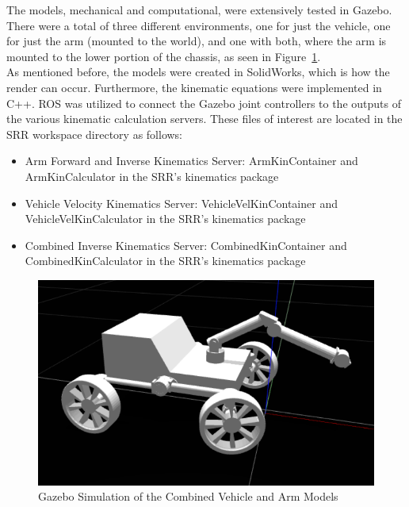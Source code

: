 The models, mechanical and computational, were extensively tested in Gazebo. There were a total of three different environments, one for just the vehicle, one for just the arm (mounted to the world), and one with both, where the arm is mounted to the lower portion of the chassis, as seen in Figure~\ref{sample_return_rover:model_validation:combined}. \\

As mentioned before, the models were created in SolidWorks, which is how the render can occur. Furthermore, the kinematic equations were implemented in C++. ROS was utilized to connect the Gazebo joint controllers to the outputs of the various kinematic calculation servers. These files of interest are located in the \ac{SRR} workspace directory as follows:

\begin{itemize}
	\item Arm Forward and Inverse Kinematics Server: ArmKinContainer and ArmKinCalculator in the SRR's kinematics package
	\item Vehicle Velocity Kinematics Server: VehicleVelKinContainer and VehicleVelKinCalculator in the SRR's kinematics package
	\item Combined Inverse Kinematics Server: CombinedKinContainer and CombinedKinCalculator in the SRR's kinematics package
\end{itemize}

\begin{figure}[H]
	\centering
	\includegraphics[width=\textwidth]{sections/robot-design/images/combined_sim.png}
	\caption{Gazebo Simulation of the Combined Vehicle and Arm Models}
	\label{sample_return_rover:model_validation:combined}
\end{figure}
